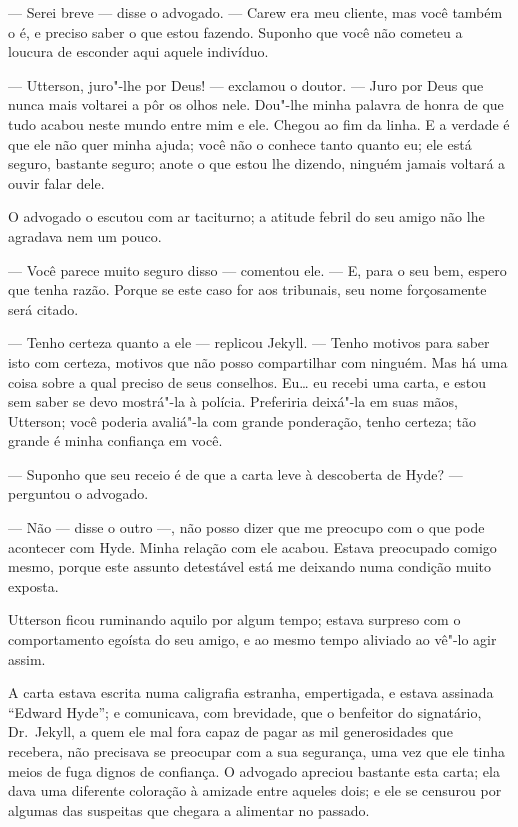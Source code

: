 --- Serei breve --- disse o advogado. --- Carew era meu cliente, mas você
também o é, e preciso saber o que estou fazendo. Suponho que você não
cometeu a loucura de esconder aqui aquele indivíduo.

--- Utterson, juro"-lhe por Deus! --- exclamou o doutor. --- Juro por Deus
que nunca mais voltarei a pôr os olhos nele.  Dou"-lhe minha palavra de
honra de que tudo acabou neste mundo entre mim e ele.  Chegou ao fim da
linha.  E a verdade é que ele não quer minha ajuda; você não o conhece
tanto quanto eu; ele está seguro, bastante seguro; anote o que estou
lhe dizendo, ninguém jamais voltará a ouvir falar dele. 

O advogado o escutou com ar taciturno; a atitude febril do seu amigo não
lhe agradava nem um pouco.

--- Você parece muito seguro disso --- comentou ele. --- E, para o seu bem,
espero que tenha razão.  Porque se este caso for aos tribunais, seu
nome forçosamente será citado.

--- Tenho certeza quanto a ele --- replicou Jekyll. --- Tenho motivos para
saber isto com certeza, motivos que não posso compartilhar com ninguém.
 Mas há uma coisa sobre a qual preciso de seus conselhos. Eu\ldots{} eu
recebi uma carta, e estou sem saber se devo mostrá"-la à polícia. 
Preferiria deixá"-la em suas mãos, Utterson; você poderia avaliá"-la com
grande ponderação, tenho certeza; tão grande é minha confiança em você.

--- Suponho que seu receio é de que a carta leve à descoberta de Hyde? ---
perguntou o advogado.

--- Não --- disse o outro ---, não posso dizer que me preocupo com o que
pode acontecer com Hyde.  Minha relação com ele acabou.  Estava
preocupado comigo mesmo, porque este assunto detestável está me
deixando numa condição muito exposta.

Utterson ficou ruminando aquilo por algum tempo; estava surpreso com o
comportamento egoísta do seu amigo, e ao mesmo tempo aliviado ao vê"-lo
agir assim.

A carta estava escrita numa caligrafia estranha, empertigada, e estava
assinada “Edward Hyde”; e comunicava, com brevidade, que o benfeitor do
signatário, Dr.~Jekyll, a quem ele mal fora capaz de pagar as mil
generosidades que recebera, não precisava se preocupar com a sua
segurança, uma vez que ele tinha meios de fuga dignos de confiança.  O
advogado apreciou bastante esta carta; ela dava uma diferente coloração
à amizade entre aqueles dois; e ele se censurou por algumas das
suspeitas que chegara a alimentar no passado.

